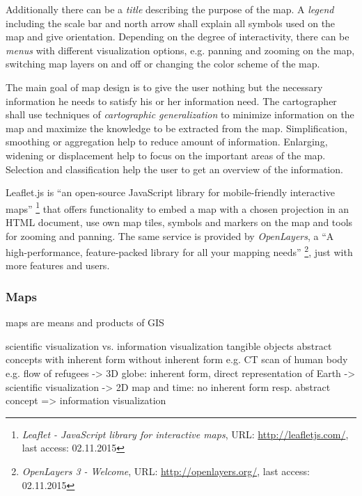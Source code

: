 Additionally there can be a \emph{title} describing the purpose of the map. A \emph{legend} including the scale bar and north arrow shall explain all symbols used on the map and give orientation. Depending on the degree of interactivity, there can be \emph{menus} with different visualization options, e.g. panning and zooming on the map, switching map layers on and off or changing the color scheme of the map.
\cite[pp. 159-166]{bolstad2008gis}


The main goal of map design is to give the user nothing but the necessary information he needs to satisfy his or her information need. The cartographer shall use techniques of \emph{cartographic generalization} to minimize information on the map and maximize the knowledge to be extracted from the map. Simplification, smoothing or aggregation help to reduce amount of information. Enlarging, widening or displacement help to focus on the important areas of the map. Selection and classification help the user to get an overview of the information.
\cite{krygier2005making}

Leaflet.js is ``an open-source JavaScript library for mobile-friendly interactive maps''
\footnote{
  \textit{Leaflet - JavaScript library for interactive maps},
  URL: \url{http://leafletjs.com/},
  last access: 02.11.2015
}
that offers functionality to embed a map with a chosen projection in an HTML document, use own map tiles, symbols and markers on the map and tools for zooming and panning.
The same service is provided by \emph{OpenLayers}, a ``A high-performance, feature-packed library for all your mapping needs''
\footnote{
  \textit{OpenLayers 3 - Welcome},
  URL: \url{http://openlayers.org/},
  last access: 02.11.2015
}, just with more features and users.


\subsubsection{Maps} %
\label{ssub:maps}


maps are means and products of GIS

scientific visualization vs. information visualization
  tangible objects            abstract concepts
  with inherent form          without inherent form
  e.g. CT scan of human body  e.g. flow of refugees
-> 3D globe: inherent form, direct representation of Earth -> scientific visualization
-> 2D map and time: no inherent form resp. abstract concept
=> information visualization

